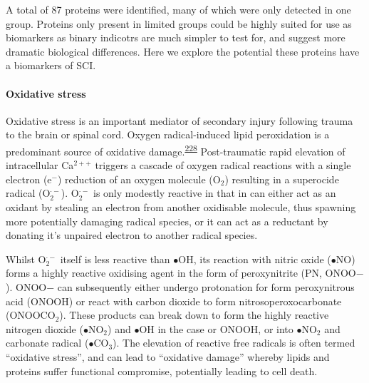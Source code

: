 \documentclass[
]{article}
\begin{document}
A total of 87 proteins were identified, many of which were only detected in one group.
Proteins only present in limited groups could be highly suited for use as biomarkers as binary indicotrs are much simpler to test for, and suggest more dramatic biological differences.
Here we explore the potential these proteins have a biomarkers of SCI.

\hypertarget{oxidative-stress}{%
\paragraph{Oxidative stress}\label{oxidative-stress}}

Oxidative stress is an important mediator of secondary injury following trauma to the brain or spinal cord.
Oxygen radical-induced lipid peroxidation is a predominant source of oxidative damage.\textsuperscript{\protect\hyperlink{ref-hall_lipid_2016}{228}}
Post-traumatic rapid elevation of intracellular Ca\(^{2++}\) triggers a cascade of oxygen radical reactions with a single electron (e\(^{-}\)) reduction of an oxygen molecule (O\(_2\)) resulting in a superocide radical (O\(_2^{\cdot -}\)).
O\(_2^{\cdot -}\) is only modestly reactive in that in can either act as an oxidant by stealing an electron from another oxidisable molecule, thus spawning more potentially damaging radical species, or it can act as a reductant by donating it's unpaired electron to another radical species.

Whilst O\(_2^{\cdot -}\) itself is less reactive than \(\bullet\)OH, its reaction with nitric oxide (\(\bullet\)NO) forms a highly reactive oxidising agent in the form of peroxynitrite (PN, ONOO\(-\)).
ONOO\(-\) can subsequently either undergo protonation for form peroxynitrous acid (ONOOH) or react with carbon dioxide to form nitrosoperoxocarbonate (ONOOCO\(_2\)).
These products can break down to form the highly reactive nitrogen dioxide (\(\bullet\)NO\(_2\)) and \(\bullet\)OH in the case or ONOOH, or into \(\bullet\)NO\(_2\) and carbonate radical (\(\bullet\)CO\(_3\)).
The elevation of reactive free radicals is often termed ``oxidative stress'', and can lead to ``oxidative damage'' whereby lipids and proteins suffer functional compromise, potentially leading to cell death.
\end{document}
